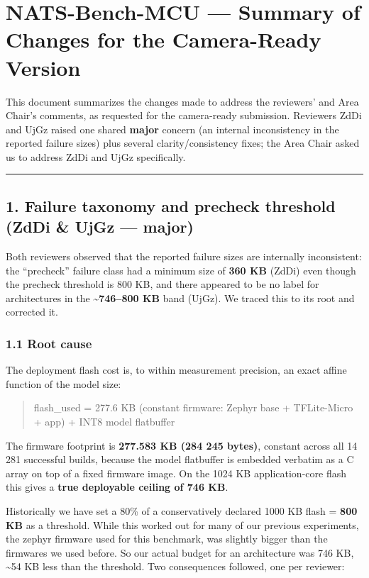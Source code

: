 \documentclass[11pt]{article}
\begin{document}
\section*{NATS-Bench-MCU --- Summary of Changes for the Camera-Ready Version}

This document summarizes the changes made to address the reviewers' and Area Chair's comments, as requested for the camera-ready submission. Reviewers ZdDi and UjGz raised one shared \textbf{major} concern (an internal inconsistency in the reported failure sizes) plus several clarity/consistency fixes; the Area Chair asked us to address ZdDi and UjGz specifically.


\vspace{2pt}\hrule\vspace{6pt}

\subsection*{1. Failure taxonomy and precheck threshold (ZdDi \& UjGz --- major)}

Both reviewers observed that the reported failure sizes are internally inconsistent: the ``precheck'' failure class had a minimum size of \textbf{360 KB} (ZdDi) even though the precheck threshold is 800 KB, and there appeared to be no label for architectures in the \textbf{\textasciitilde{}746--800 KB} band (UjGz). We traced this to its root and corrected it.


\subsubsection*{1.1 Root cause}

The deployment flash cost is, to within measurement precision, an exact affine function of the model size:


\begin{quote}\ttfamily\footnotesize
flash\_used  =  277.6 KB (constant firmware: Zephyr base + TFLite-Micro + app)  +  INT8 model flatbuffer\\
\end{quote}

The firmware footprint is \textbf{277.583 KB (284 245 bytes)}, constant across all 14 281 successful builds, because the model flatbuffer is embedded verbatim as a C array on top of a fixed firmware image. On the 1024 KB application-core flash this gives a \textbf{true deployable ceiling of 746 KB}.


Historically we have set a 80\% of a conservatively declared 1000 KB flash = \textbf{800 KB} as a threshold. While this worked out for many of our previous experiments, the zephyr firmware used for this benchmark, was slightly bigger than the firmwares we used before. So our actual budget for an architecture was 746 KB, \textasciitilde{}54 KB less than the threshold. Two consequences followed, one per reviewer:
\end{document}
